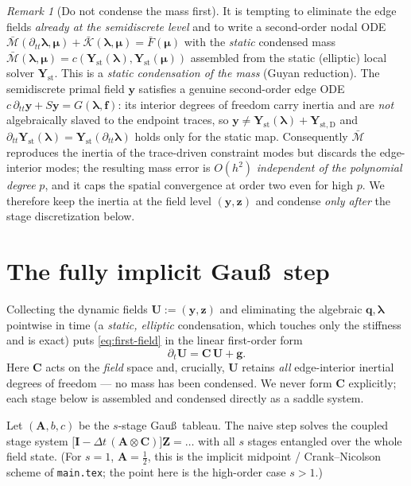 \documentclass[11pt]{article}
\theoremstyle{remark}
\newtheorem*{remark}{Remark}
\renewcommand{\vec}{\boldsymbol}
\newcommand{\bvec}[1]{\vec{#1}}
\newcommand{\vldh}{\bvec\lambda}         %
\newcommand{\del}{\partial}
\newcommand{\kron}{\otimes}
\newcommand{\mA}{\mathbf{A}}
\newcommand{\mC}{\mathbf{C}}
\newcommand{\mI}{\mathbf{I}}
\newcommand{\Mbar}{\bar{\mathcal M}}     %
\newcommand{\Kbar}{\bar{\mathcal K}}     %
\newcommand{\dt}{\Delta t}
\begin{document}
\begin{remark}[Do not condense the mass first]\label{rem:guyan}
It is tempting to eliminate the edge fields \emph{already at the semidiscrete
level} and to write a second-order nodal ODE
$\Mbar(\del_{tt}\vldh,\bvec\mu)+\Kbar(\vldh,\bvec\mu)=\bar F(\bvec\mu)$ with the
\emph{static} condensed mass $\Mbar(\vldh,\bvec\mu)=c(\bvec Y_{\mathrm
{st}}(\vldh),\bvec Y_{\mathrm{st}}(\bvec\mu))$ assembled from the static
(elliptic) local solver $\bvec Y_{\mathrm{st}}$. This is a \emph{static
condensation of the mass} (Guyan reduction). The semidiscrete primal field
$\bvec y$ satisfies a genuine second-order edge ODE $c\,\del_{tt}\bvec y+S\bvec
y=G(\vldh,\vec f)$: its interior degrees of freedom carry inertia and are
\emph{not} algebraically slaved to the endpoint traces, so
$\bvec y\neq \bvec Y_{\mathrm{st}}(\vldh)+\bvec Y_{\mathrm{st},\mathrm D}$ and
$\del_{tt}\bvec Y_{\mathrm{st}}(\vldh)=\bvec Y_{\mathrm{st}}(\del_{tt}\vldh)$
holds only for the static map. Consequently $\Mbar$ reproduces the inertia of the
trace-driven constraint modes but discards the edge-interior modes; the resulting
mass error is $O(h^2)$ \emph{independent of the polynomial degree} $p$, and it
caps the spatial convergence at order two even for high $p$. We therefore keep the
inertia at the field level $(\bvec y,\bvec z)$ and condense \emph{only after} the
stage discretization below.
\end{remark}

\section{The fully implicit Gau\ss\ step}

Collecting the dynamic fields $\bvec U:=(\bvec y,\bvec z)$ and eliminating the
algebraic $\bvec q,\vldh$ pointwise in time (a \emph{static, elliptic}
condensation, which touches only the stiffness and is exact) puts
\eqref{eq:first-field} in the linear first-order form
\begin{equation}\label{eq:first}
  \del_t\bvec U=\mC\,\bvec U+\bvec g .
\end{equation}
Here $\mC$ acts on the \emph{field} space and, crucially, $\bvec U$ retains
\emph{all} edge-interior inertial degrees of freedom --- no mass has been
condensed. We never form $\mC$ explicitly; each stage below is assembled and
condensed directly as a saddle system.

Let $(\mA,b,c)$ be the $s$-stage Gau\ss\ tableau. The naive step solves the
coupled stage system $\bigl[\mI-\dt\,(\mA\kron\mC)\bigr]\bvec Z=\dots$ with all $s$
stages entangled over the whole field state. (For $s=1$, $\mA=\tfrac12$, this is
the implicit midpoint / Crank--Nicolson scheme of \texttt{main.tex}; the point here
is the high-order case $s>1$.)
\end{document}
